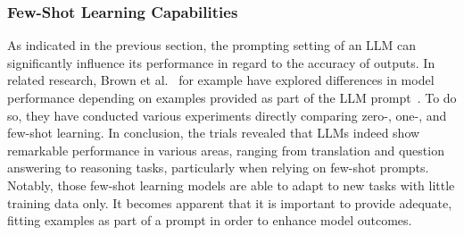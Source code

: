 
\subsubsection{Few-Shot Learning Capabilities}
As indicated in the previous section, the prompting setting of an LLM can significantly influence its
performance in regard to the accuracy of outputs.
In related research, Brown et al\(.\)~\cite{brown_language_2020} for example have explored differences
in model performance depending on examples provided as part of the LLM prompt~\cite{brown_language_2020}.
To do so, they have conducted various experiments directly comparing zero-, one-, and few-shot learning.
In conclusion, the trials revealed that LLMs indeed show remarkable performance in various areas,
ranging from translation and question answering to reasoning tasks, particularly when relying on few-shot
prompts.
Notably, those few-shot learning models are able to adapt to new tasks with little training data only.
It becomes apparent that it is important to provide adequate, fitting examples as part of a prompt in order
to enhance model outcomes.

